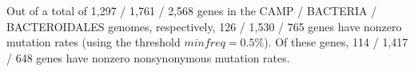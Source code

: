 Out of a total of 1,297 / 1,761 / 2,568 genes in the CAMP / BACTERIA / BACTEROIDALES genomes, respectively, 126 / 1,530 / 765 genes have nonzero mutation rates (using the threshold $minfreq=0.5\%$). Of these genes, 114 / 1,417 / 648 genes have nonzero nonsynonymous mutation rates.
